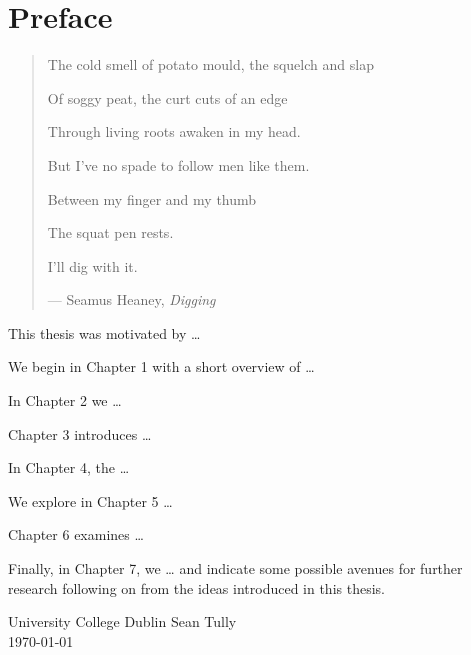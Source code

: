 %
%
%
%

\chapter*{Preface}

\begin{quote}
The cold smell of potato mould, the squelch and slap

Of soggy peat, the curt cuts of an edge

Through living roots awaken in my head.

But I've no spade to follow men like them.

Between my finger and my thumb

The squat pen rests.

I'll dig with it.

\hspace{2cm}--- Seamus Heaney, \emph{Digging}
\end{quote}

This thesis was motivated by \ldots

We begin in Chapter 1 with a short overview of \ldots 

In Chapter 2 we \ldots 

Chapter 3 introduces \ldots 

In Chapter 4, the \ldots 

We explore in Chapter 5 \ldots 

Chapter 6 examines \ldots 

Finally, in Chapter 7, we \ldots{} 
and indicate some possible avenues for further research following on from the
ideas introduced in this thesis.

\vspace{2em}

University College Dublin \hfill Sean Tully \\
\today 
